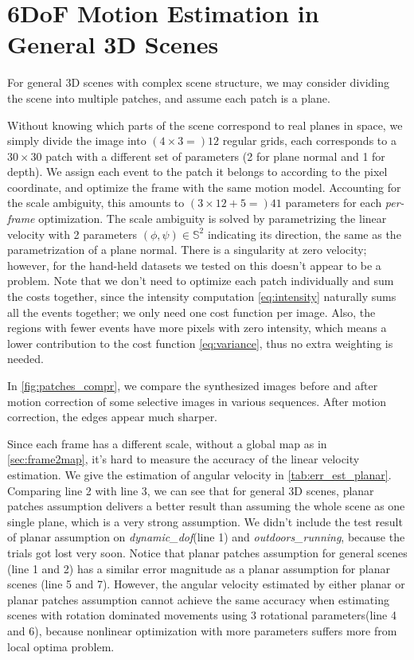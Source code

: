   \chapter{6DoF Motion Estimation in General 3D Scenes}
  \label{chap:general_scene}

  For general 3D scenes with complex scene structure, we may consider
  dividing the scene into multiple patches, and assume each patch is a
  plane.

  Without knowing which parts of the scene correspond to real planes
  in space, we simply divide the image into $(4\times3=)12$ regular
  grids, each corresponds to a $30\times30$ patch with a different set
  of parameters (2 for plane normal and 1 for depth). We assign each
  event to the patch it belongs to according to the pixel coordinate,
  and optimize the frame with the same motion model. Accounting for
  the scale ambiguity, this amounts to $(3\times12+5=)41$ parameters
  for each \textit{per-frame} optimization. The scale ambiguity is
  solved by parametrizing the linear velocity with 2 parameters
  $(\phi,\psi)\in\mathbb{S}^2$ indicating its direction, the same as
  the parametrization of a plane normal. There is a singularity at zero
  velocity; however, for the hand-held datasets we tested on this
  doesn't appear to be a problem.  Note that we don't need to optimize
  each patch individually and sum the costs together, since the
  intensity computation \cref{eq:intensity} naturally sums all the
  events together; we only need one cost function per image. Also, the
  regions with fewer events have more pixels with zero intensity,
  which means a lower contribution to the cost function
  \cref{eq:variance}, thus no extra weighting is needed.

  In \cref{fig:patches_compr}, we compare the synthesized images
  before and after motion correction of some selective images in
  various sequences. After motion correction, the edges appear much
  sharper.

  Since each frame has a different scale, without a global map as in
  \cref{sec:frame2map}, it's hard to measure the accuracy of the
  linear velocity estimation. We give the estimation of angular
  velocity in \cref{tab:err_est_planar}. Comparing line 2 with line 3,
  we can see that for general 3D scenes, planar patches assumption
  delivers a better result than assuming the whole scene as one single
  plane, which is a very strong assumption. We didn't include the test
  result of planar assumption on \emph{dynamic\_dof}(line 1) and
  \emph{outdoors\_running}, because the trials got lost very
  soon. Notice that planar patches assumption for general scenes (line
  1 and 2) has a similar error magnitude as a planar assumption for
  planar scenes (line 5 and 7). However, the angular velocity
  estimated by either planar or planar patches assumption cannot
  achieve the same accuracy when estimating scenes with rotation
  dominated movements using 3 rotational parameters(line 4 and 6),
  because nonlinear optimization with more parameters suffers more
  from local optima problem.

